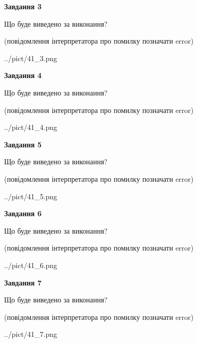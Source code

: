 \documentclass[12pt, ukrainian]{article}
\begin{document}
{\begin {large}
{\begin {center}\textbf{Завдання 3}\end {center}}\par
Що буде виведено за виконання?\par
 (повідомлення інтерпретатора про помилку позначати error)\par
\begin{center}
	{../pict/41_3.png}
\end{center}
\newpage

{\begin {center}\textbf{Завдання 4}\end {center}}\par
Що буде виведено за виконання?\par
 (повідомлення інтерпретатора про помилку позначати error)\par
\begin{center}
	{../pict/41_4.png}
\end{center}
\newpage

{\begin {center}\textbf{Завдання 5}\end {center}}\par
Що буде виведено за виконання?\par
 (повідомлення інтерпретатора про помилку позначати error)\par
\begin{center}
	{../pict/41_5.png}
\end{center}
\newpage

{\begin {center}\textbf{Завдання 6}\end {center}}\par
Що буде виведено за виконання?\par
 (повідомлення інтерпретатора про помилку позначати error)\par
\begin{center}
	{../pict/41_6.png}
\end{center}
\newpage

{\begin {center}\textbf{Завдання 7}\end {center}}\par
Що буде виведено за виконання?\par
 (повідомлення інтерпретатора про помилку позначати error)\par
\begin{center}
	{../pict/41_7.png}
\end{center}
\newpage


\end{large}}
\end{document}

